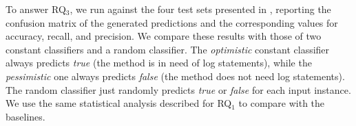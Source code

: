 To answer RQ$_3$, we run \approach against the four test sets presented in , reporting the confusion matrix of the generated predictions and the corresponding values for accuracy, recall, and precision. We compare these results with those of two constant classifiers and a random classifier. The \emph{optimistic} constant classifier always predicts \emph{true} (\ie the method is in need of log statements), while the \emph{pessimistic} one always predicts \emph{false} (\ie the method does not need log statements). The random classifier just randomly predicts \emph{true} or \emph{false} for each input instance. We use the same statistical analysis described for RQ$_1$ to compare \approach with the baselines.